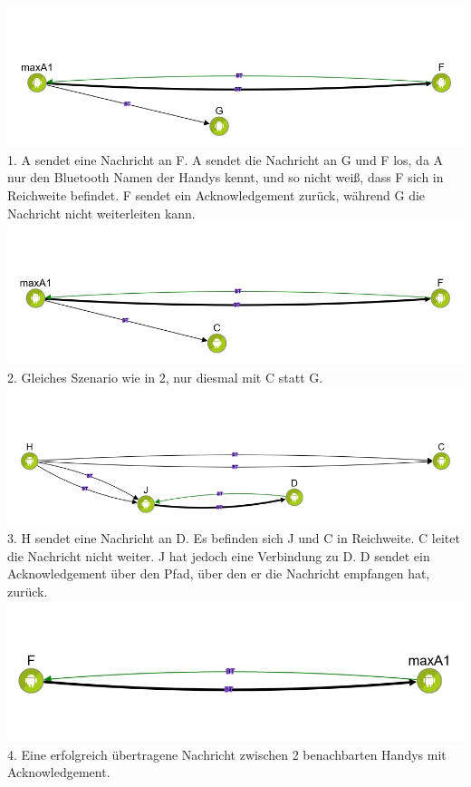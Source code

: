 \includegraphics[width=1.0\textwidth]{belege/grosstests/Bilder/Erfolg4.jpg}\\
1. A sendet eine Nachricht an F. A sendet die Nachricht an G und F los, da A nur den
Bluetooth Namen der Handys kennt, und so nicht weiß, dass F sich in
Reichweite befindet. F sendet ein Acknowledgement zurück, während G die
Nachricht nicht weiterleiten kann.\\
\includegraphics[width=1.0\textwidth]{belege/grosstests/Bilder/Erfolg3.jpg}\\
2. Gleiches Szenario wie in 2, nur diesmal mit C statt G.\\
\includegraphics[width=1.0\textwidth]{belege/grosstests/Bilder/Erfolg2.jpg}\\ 3. H sendet eine
Nachricht an D. Es befinden sich J und C in Reichweite. C leitet die
Nachricht nicht weiter. J hat jedoch eine Verbindung zu D. D sendet ein
Acknowledgement über den Pfad, über den er die Nachricht empfangen hat,
zurück.\\ \includegraphics[width=1.0\textwidth]{belege/grosstests/Bilder/Erfolg1.jpg} \\4. Eine
erfolgreich übertragene Nachricht zwischen 2 benachbarten Handys mit
Acknowledgement.

